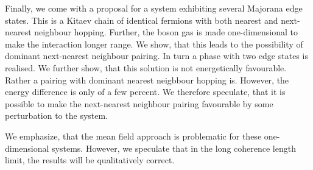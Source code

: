Finally, we come with a proposal for a system exhibiting several Majorana edge states. This is a Kitaev chain of identical fermions with both nearest and next-nearest neighbour hopping. Further, the boson gas is made one-dimensional to make the interaction longer range. We show, that this leads to the possibility of dominant next-nearest neighbour pairing. In turn a phase with two edge states is realised. We further show, that this solution is not energetically favourable. Rather a pairing with dominant nearest neigbbour hopping is. However, the energy difference is only of a few percent. We therefore speculate, that it is possible to make the next-nearest neighbour pairing favourable by some perturbation to the system. 

We emphasize, that the mean field approach is problematic for these one-dimensional systems. However, we speculate that in the long coherence length limit, the results will be qualitatively correct. 